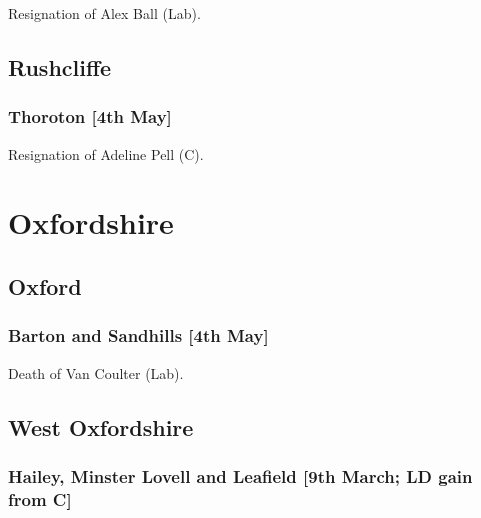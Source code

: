\documentclass[a4paper,openany]{book}
\begin{document}
\begin{resultsiii}

Resignation of Alex Ball (Lab).

\subsection*{Rushcliffe}

\subsubsection*{Thoroton \hspace*{\fill}\nolinebreak[1]%
\enspace\hspace*{\fill}
[4th May]}


Resignation of Adeline Pell (C).

\section{Oxfordshire}

\subsection*{Oxford}

\subsubsection*{Barton and Sandhills \hspace*{\fill}\nolinebreak[1]%
\enspace\hspace*{\fill}
[4th May]}


Death of Van Coulter (Lab).

\subsection*{West Oxfordshire}

\subsubsection*{Hailey, Minster Lovell and Leafield \hspace*{\fill}\nolinebreak[1]%
\enspace\hspace*{\fill}
[9th March; LD gain from C]}


\end{resultsiii}
\end{document}
